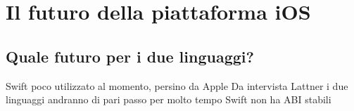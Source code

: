 \chapter{Il futuro della piattaforma iOS}
\section{Quale futuro per i due linguaggi?}
Swift poco utilizzato al momento, persino da Apple
Da intervista Lattner i due linguaggi andranno di pari passo per molto tempo
Swift non ha ABI stabili 